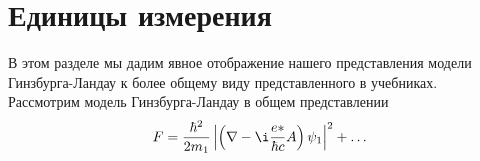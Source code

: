 \chapter{Единицы измерения}

В этом разделе мы дадим явное отображение нашего представления модели 
Гинзбурга-Ландау к более общему виду представленного в учебниках. 
Рассмотрим модель Гинзбурга-Ландау в общем представлении
\begin{align*}
	F = \frac{\hbar^2}{2m_1}\left| 
		\left( \nabla - \i\frac{e*}{\hbar c}A \right)\psi_1\right|^2 + 
		\ldots 
\end{align*}